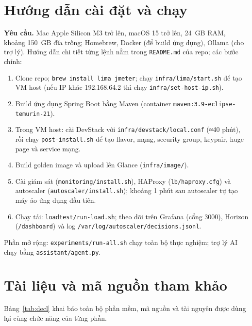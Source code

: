 \documentclass[runningheads]{llncs}
\newcommand{\code}[1]{\texttt{#1}}
\begin{document}
\section{Hướng dẫn cài đặt và chạy}

\textbf{Yêu cầu.} Mac Apple Silicon M3 trở lên, macOS 15 trở lên, 24~GB RAM, khoảng 150~GB đĩa trống; Homebrew, Docker (để build ứng dụng), Ollama (cho trợ lý). Hướng dẫn chi tiết từng lệnh nằm trong \code{README.md} của repo; các bước chính:
\begin{enumerate}
\item Clone repo; \code{brew install lima jmeter}; chạy \code{infra/lima/start.sh} để tạo VM host (nếu IP khác 192.168.64.2 thì chạy \code{infra/set-host-ip.sh}).
\item Build ứng dụng Spring Boot bằng Maven (container \code{maven:3.9-eclipse-temurin-21}).
\item Trong VM host: cài DevStack với \code{infra/devstack/local.conf} (≈40 phút), rồi chạy \code{post-install.sh} để tạo flavor, mạng, security group, keypair, huge page và service mạng.
\item Build golden image và upload lên Glance (\code{infra/image/}).
\item Cài giám sát (\code{monitoring/install.sh}), HAProxy (\code{lb/haproxy.cfg}) và autoscaler (\code{autoscaler/install.sh}); khoảng 1 phút sau autoscaler tự tạo máy ảo ứng dụng đầu tiên.
\item Chạy tải: \code{loadtest/run-load.sh}; theo dõi trên Grafana (cổng 3000), Horizon (\code{/dashboard}) và log \code{/var/log/autoscaler/decisions.jsonl}.
\end{enumerate}
Phần mở rộng: \code{experiments/run-all.sh} chạy toàn bộ thực nghiệm; trợ lý AI chạy bằng \code{assistant/agent.py}.

\section{Tài liệu và mã nguồn tham khảo}

Bảng~\ref{tab:decl} khai báo toàn bộ phần mềm, mã nguồn và tài nguyên được dùng lại cùng chức năng của từng phần.
\end{document}
